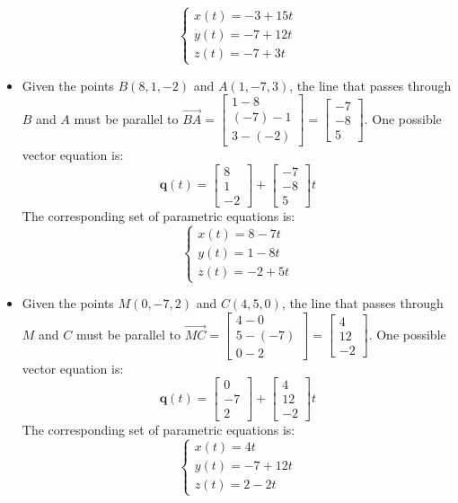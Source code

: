 \documentclass{article}
\begin{document}
\begin{itemize}
\[\left\{\begin{array}{c} x(t) = -3 + 15t \\ y(t) = -7 + 12t \\ z(t) = -7 + 3t \end{array}\right.\]
\item Given the points \(B(8, 1, -2)\) and \(A(1, -7, 3)\), the line that passes through \(B\) and \(A\) must be parallel to \(\overrightarrow{BA} = \begin{bmatrix} 1 - 8 \\ (-7) - 1 \\ 3 - (-2) \end{bmatrix} = \begin{bmatrix} -7 \\ -8 \\ 5 \end{bmatrix}\). One possible vector equation is:
\[\mathbf{q}(t) = \begin{bmatrix} 8 \\ 1 \\ -2 \end{bmatrix} + \begin{bmatrix} -7 \\ -8 \\ 5 \end{bmatrix}t\]
The corresponding set of parametric equations is: 
\[\left\{\begin{array}{c} x(t) = 8 - 7t \\ y(t) = 1 - 8t \\ z(t) = -2 + 5t \end{array}\right.\]
\item Given the points \(M(0, -7, 2)\) and \(C(4, 5, 0)\), the line that passes through \(M\) and \(C\) must be parallel to \(\overrightarrow{MC} = \begin{bmatrix} 4 - 0 \\ 5 - (-7) \\ 0 - 2 \end{bmatrix} = \begin{bmatrix} 4 \\ 12 \\ -2 \end{bmatrix}\). One possible vector equation is:
\[\mathbf{q}(t) = \begin{bmatrix} 0 \\ -7 \\ 2 \end{bmatrix} + \begin{bmatrix} 4 \\ 12 \\ -2 \end{bmatrix}t\]
The corresponding set of parametric equations is:
\[\left\{\begin{array}{c} x(t) = 4t \\ y(t) = -7 + 12t \\ z(t) = 2 - 2t \end{array}\right.\]
\end{itemize}
\end{document}
